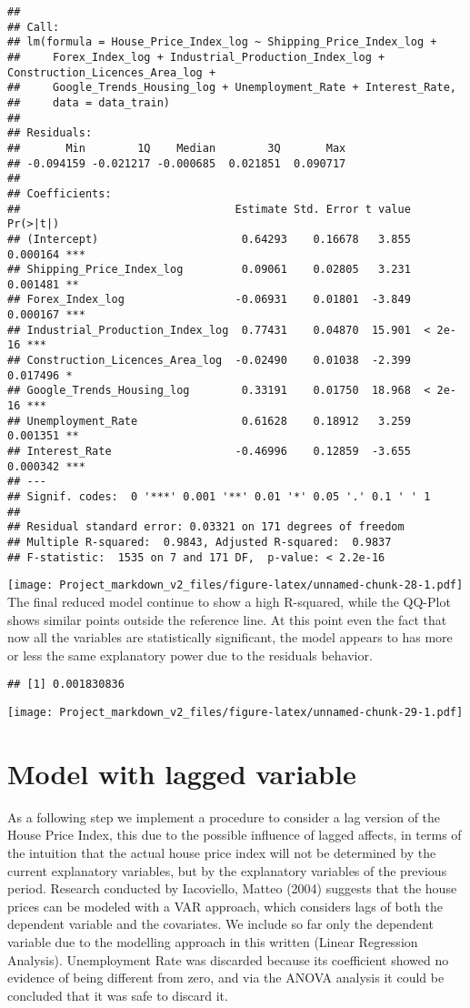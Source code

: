 \documentclass[
]{article}
\begin{document}
\begin{verbatim}
## 
## Call:
## lm(formula = House_Price_Index_log ~ Shipping_Price_Index_log + 
##     Forex_Index_log + Industrial_Production_Index_log + Construction_Licences_Area_log + 
##     Google_Trends_Housing_log + Unemployment_Rate + Interest_Rate, 
##     data = data_train)
## 
## Residuals:
##       Min        1Q    Median        3Q       Max 
## -0.094159 -0.021217 -0.000685  0.021851  0.090717 
## 
## Coefficients:
##                                 Estimate Std. Error t value Pr(>|t|)    
## (Intercept)                      0.64293    0.16678   3.855 0.000164 ***
## Shipping_Price_Index_log         0.09061    0.02805   3.231 0.001481 ** 
## Forex_Index_log                 -0.06931    0.01801  -3.849 0.000167 ***
## Industrial_Production_Index_log  0.77431    0.04870  15.901  < 2e-16 ***
## Construction_Licences_Area_log  -0.02490    0.01038  -2.399 0.017496 *  
## Google_Trends_Housing_log        0.33191    0.01750  18.968  < 2e-16 ***
## Unemployment_Rate                0.61628    0.18912   3.259 0.001351 ** 
## Interest_Rate                   -0.46996    0.12859  -3.655 0.000342 ***
## ---
## Signif. codes:  0 '***' 0.001 '**' 0.01 '*' 0.05 '.' 0.1 ' ' 1
## 
## Residual standard error: 0.03321 on 171 degrees of freedom
## Multiple R-squared:  0.9843, Adjusted R-squared:  0.9837 
## F-statistic:  1535 on 7 and 171 DF,  p-value: < 2.2e-16
\end{verbatim}

\texttt{[image: Project\_markdown\_v2\_files/figure-latex/unnamed-chunk-28-1.pdf]}
The final reduced model continue to show a high R-squared, while the
QQ-Plot shows similar points outside the reference line. At this point
even the fact that now all the variables are statistically significant,
the model appears to has more or less the same explanatory power due to
the residuals behavior.

\begin{verbatim}
## [1] 0.001830836
\end{verbatim}

\texttt{[image: Project\_markdown\_v2\_files/figure-latex/unnamed-chunk-29-1.pdf]}

\section{Model with lagged variable}\label{model-with-lagged-variable}

As a following step we implement a procedure to consider a lag version
of the House Price Index, this due to the possible influence of lagged
affects, in terms of the intuition that the actual house price index
will not be determined by the current explanatory variables, but by the
explanatory variables of the previous period. Research conducted by
Iacoviello, Matteo (2004) suggests that the house prices can be modeled
with a VAR approach, which considers lags of both the dependent variable
and the covariates. We include so far only the dependent variable due to
the modelling approach in this written (Linear Regression Analysis).
Unemployment Rate was discarded because its coefficient showed no
evidence of being different from zero, and via the ANOVA analysis it
could be concluded that it was safe to discard it.
\end{document}
